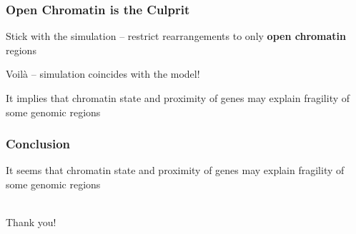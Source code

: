 \documentclass[svgnames,14pt]{beamer}
\begin{document}
\begin{frame}
\frametitle{Open Chromatin is the Culprit}
Stick with the simulation -- restrict rearrangements to only \textbf{open chromatin} regions

\vspace{12pt}
Voilà -- simulation coincides with the model!

It implies that chromatin state and proximity of genes may explain fragility of some genomic regions
\end{frame}


\begin{frame}
\frametitle{Conclusion}
It seems that chromatin state and proximity of genes may explain fragility of some genomic regions
\end{frame}

\begin{frame}
\begin{center}
\hfill \huge \\
Thank you!
\end{center}
\end{frame}
\end{document}
